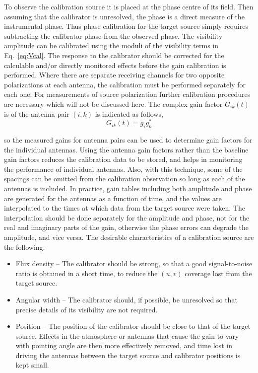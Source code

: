 To observe the calibration source it is placed at the phase centre of its field. Then assuming that the calibrator is unresolved, the phase is a direct measure of the instrumental phase. Thus phase calibration for the target source simply requires subtracting the calibrator phase from the observed phase. The visibility amplitude can be calibrated using the moduli of the visibility terms in Eq.~\ref{eq:Vcal}. The response to the calibrator should be corrected for the calculable and/or directly monitored effects before the gain calibration is performed. Where there are separate receiving channels for two opposite polarizations at each antenna, the calibration must be performed separately for each one. For measurements of source polarization further calibration procedures are necessary which will not be discussed here.
The complex gain factor $G_{ik}(t)$ is of the antenna pair $(i,k)$ is indicated as follows,
\begin{equation}
\label{eq:Gain}
G_{ik}(t) = g_ig^{\ast}_k
\end{equation}

so the measured gains for antenna pairs can be used to determine gain factors for the individual antennas. Using the antenna gain factors rather than the baseline gain factors reduces the calibration data to be stored, and helps in monitoring the performance of individual antennas. Also, with this technique, some of the spacings can be omitted from the calibration observation so long as each of the antennas is included. In practice, gain tables including both amplitude and phase are generated for the antennas as a function of time, and the values are interpolated to the times at which data from the target source were taken. The interpolation should be done separately for the amplitude and phase, not for the real and imaginary parts of the gain, otherwise the phase errors can degrade the amplitude, and vice versa. The desirable characteristics of a calibration source are the following.
\begin{itemize}
\item Flux density -- The calibrator should be strong, so that a good signal-to-noise ratio is obtained in a short time, to reduce the $(u, v)$ coverage lost from the target source.
\item Angular width -- The calibrator should, if possible, be unresolved so that precise details of its visibility are not required.
\item Position -- The position of the calibrator should be close to that of the target source. Effects in the atmosphere or antennas that cause the gain to vary
with pointing angle are then more effectively removed, and time lost in
driving the antennas between the target source and calibrator positions is
kept small. 
\end{itemize}

